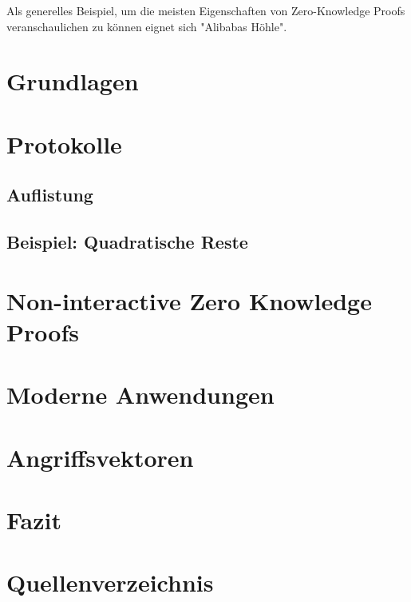 \documentclass {article}
\begin{document}
Als generelles Beispiel, um die meisten Eigenschaften von Zero-Knowledge Proofs veranschaulichen zu k\"onnen eignet sich "Alibabas H\"ohle".


\section{Grundlagen}
\section{Protokolle}
\subsection{Auflistung}
\subsection{Beispiel: Quadratische Reste}
\section{Non-interactive Zero Knowledge Proofs}
\section{Moderne Anwendungen}
\section{Angriffsvektoren}
\section{Fazit}
\section{Quellenverzeichnis}
\end{document}
